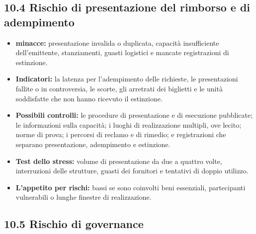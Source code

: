\documentclass[11pt]{article}
\begin{document}
\subsection*{10.4 Rischio di presentazione del rimborso e di adempimento}

\begin{itemize}[leftmargin=*]
\item \textbf{minacce:} presentazione invalida o duplicata, capacità insufficiente dell'emittente, stanziamenti, guasti logistici e mancate registrazioni di estinzione.
\item \textbf{Indicatori:} la latenza per l'adempimento delle richieste, le presentazioni fallite o in controversia, le scorte, gli arretrati dei biglietti e le unità soddisfatte che non hanno ricevuto il estinzione.
\item \textbf{Possibili controlli:} le procedure di presentazione e di esecuzione pubblicate; le informazioni sulla capacità; i luoghi di realizzazione multipli, ove lecito; norme di prova; i percorsi di reclamo e di rimedio; e registrazioni che separano presentazione, adempimento e estinzione.
\item \textbf{Test dello stress:} volume di presentazione da due a quattro volte, interruzioni delle strutture, guasti dei fornitori e tentativi di doppio utilizzo.
\item \textbf{L'appetito per rischi:} bassi se sono coinvolti beni essenziali, partecipanti vulnerabili o lunghe finestre di realizzazione.
\end{itemize}
\subsection*{10.5 Rischio di governance}
\end{document}
